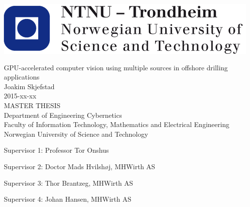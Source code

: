 \thispagestyle{empty}

\includegraphics[scale=0.35]{NTNULogo}

\begin{center}
\Huge{GPU-accelerated computer vision using multiple sources in offshore drilling applications}\\[2pc]

\Large{Joakim Skjefstad}\\[1pc]
\large{2015-xx-xx}\\[2pc]

MASTER THESIS\\
Department of Engineering Cybernetics\\
Faculty of Information Technology, Mathematics and Electrical Engineering\\
Norwegian University of Science and Technology
\end{center}
\vfill

\noindent Supervisor 1: Professor Tor Onshus

\noindent Supervisor 2: Doctor Mads Hvilshøj, MHWirth AS

\noindent Supervisor 3: Thor Brantzeg, MHWirth AS

\noindent Supervisor 4: Johan Hansen, MHWirth AS

\newpage
\thispagestyle{empty}
\mbox{}
\newpage